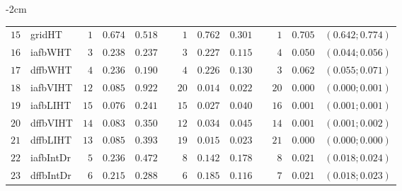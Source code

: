 \begin{table*}[!htbp]
\begin{adjustwidth*}{}{-2cm}
\begin{tabular}{@{}rlrrrrrrrrrcc@{}}
\footnotesize{$15$} & \footnotesize{gridHT   } & \footnotesize{$1 $} & \footnotesize{$0.674$} & \footnotesize{$0.518$} && \footnotesize{$1 $} & \footnotesize{$0.762$} & \footnotesize{$0.301$} && \footnotesize{$1 $} & \footnotesize{$0.705$} & \footnotesize{$(0.642;0.774)$} \\
\footnotesize{$16$} & \footnotesize{iafbWHT  } & \footnotesize{$3 $} & \footnotesize{$0.238$} & \footnotesize{$0.237$} && \footnotesize{$3 $} & \footnotesize{$0.227$} & \footnotesize{$0.115$} && \footnotesize{$4 $} & \footnotesize{$0.050$} & \footnotesize{$(0.044;0.056)$} \\
\footnotesize{$17$} & \footnotesize{dffbWHT  } & \footnotesize{$4 $} & \footnotesize{$0.236$} & \footnotesize{$0.190$} && \footnotesize{$4 $} & \footnotesize{$0.226$} & \footnotesize{$0.130$} && \footnotesize{$3 $} & \footnotesize{$0.062$} & \footnotesize{$(0.055;0.071)$} \\
\footnotesize{$18$} & \footnotesize{iafbVIHT } & \footnotesize{$12$} & \footnotesize{$0.085$} & \footnotesize{$0.922$} && \footnotesize{$20$} & \footnotesize{$0.014$} & \footnotesize{$0.022$} && \footnotesize{$20$} & \footnotesize{$0.000$} & \footnotesize{$(0.000;0.001)$} \\
\footnotesize{$19$} & \footnotesize{iafbLIHT } & \footnotesize{$15$} & \footnotesize{$0.076$} & \footnotesize{$0.241$} && \footnotesize{$15$} & \footnotesize{$0.027$} & \footnotesize{$0.040$} && \footnotesize{$16$} & \footnotesize{$0.001$} & \footnotesize{$(0.001;0.001)$} \\
\footnotesize{$20$} & \footnotesize{dffbVIHT } & \footnotesize{$14$} & \footnotesize{$0.083$} & \footnotesize{$0.350$} && \footnotesize{$12$} & \footnotesize{$0.034$} & \footnotesize{$0.045$} && \footnotesize{$14$} & \footnotesize{$0.001$} & \footnotesize{$(0.001;0.002)$} \\
\footnotesize{$21$} & \footnotesize{dffbLIHT } & \footnotesize{$13$} & \footnotesize{$0.085$} & \footnotesize{$0.393$} && \footnotesize{$19$} & \footnotesize{$0.015$} & \footnotesize{$0.023$} && \footnotesize{$21$} & \footnotesize{$0.000$} & \footnotesize{$(0.000;0.000)$} \\
\footnotesize{$22$} & \footnotesize{iafbIntDr} & \footnotesize{$5 $} & \footnotesize{$0.236$} & \footnotesize{$0.472$} && \footnotesize{$8 $} & \footnotesize{$0.142$} & \footnotesize{$0.178$} && \footnotesize{$8 $} & \footnotesize{$0.021$} & \footnotesize{$(0.018;0.024)$} \\
\footnotesize{$23$} & \footnotesize{dffbIntDr} & \footnotesize{$6 $} & \footnotesize{$0.215$} & \footnotesize{$0.288$} && \footnotesize{$6 $} & \footnotesize{$0.185$} & \footnotesize{$0.116$} && \footnotesize{$7 $} & \footnotesize{$0.021$} & \footnotesize{$(0.018;0.023)$} \\

\end{tabular}
\end{adjustwidth*}
\end{table*}
